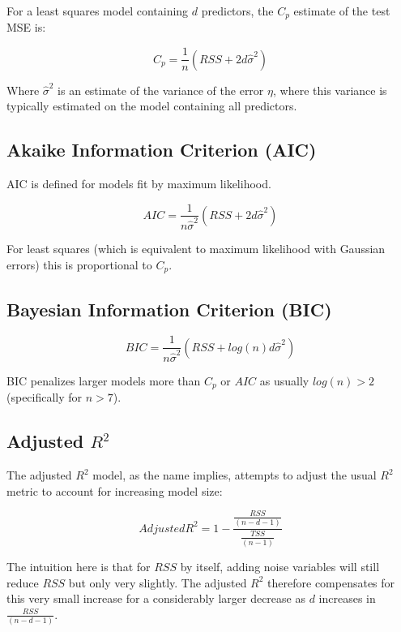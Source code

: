 For a least squares model containing $d$ predictors, the $C_{p}$ estimate of the test MSE is:

$$ C_{p} = \frac{1}{n} (RSS+2d\hat{\sigma}^{2}) $$

Where $\hat{\sigma}^{2}$ is an estimate of the variance of the error $\eta$, where this variance is typically estimated on the model containing all predictors.

\subsection{Akaike Information Criterion (AIC)}

AIC is defined for models fit by maximum likelihood.

$$ AIC = \frac{1}{n\hat{\sigma}^{2}}(RSS+2d\hat{\sigma}^{2}) $$

For least squares (which is equivalent to maximum likelihood with Gaussian errors) this is proportional to $C_{p}$.

\subsection{Bayesian Information Criterion (BIC)}

$$ BIC = \frac{1}{n\hat{\sigma}^{2}}(RSS+log(n)d\hat{\sigma}^{2}) $$

BIC penalizes larger models more than $C_{p}$ or $AIC$ as usually $log(n)>2$ (specifically for $n>7$).

\subsection{Adjusted $R^{2}$}

The adjusted $R^{2}$ model, as the name implies, attempts to adjust the usual $R^{2}$ metric to account for increasing model size:

$$ Adjusted R^{2} = 1 - \frac{\frac{RSS}{(n-d-1)}}{\frac{TSS}{(n-1)}} $$

The intuition here is that for $RSS$ by itself, adding noise variables will still reduce $RSS$ but only very slightly. The adjusted $R^{2}$ therefore compensates for this very small increase for a considerably larger decrease as $d$ increases in $\frac{RSS}{(n-d-1)}$.
